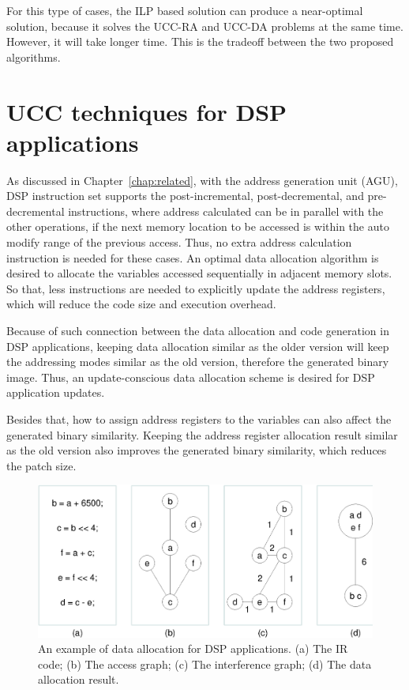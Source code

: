 For this type of cases, the ILP based solution can produce a near-optimal solution, 
because it solves the UCC-RA and UCC-DA problems at the same time. However, it will
take longer time. This is the tradeoff between the two proposed algorithms.

\section{UCC techniques for DSP applications}

As discussed in Chapter~\ref{chap:related}, with the address generation unit (AGU), DSP instruction set supports the 
post-incremental, post-decremental, and pre-decremental instructions,  where address calculated can be in parallel with 
the other operations,
if the next memory location to be accessed is within the auto modify range of the previous access.
Thus, no extra address calculation instruction is needed for these cases.
An optimal data allocation algorithm is desired to allocate the variables accessed sequentially in adjacent memory 
slots. So that, less instructions are needed to explicitly update the address registers, which will reduce the code 
size and execution overhead.

Because of such connection between the data allocation and code generation in DSP applications, keeping data allocation 
similar as the older version will keep the addressing modes similar as the old version,
therefore the generated binary image. Thus, an update-conscious data allocation scheme is desired for DSP application 
updates.

Besides that, how to assign address registers to the variables can also affect the generated binary similarity.
Keeping the address register allocation result similar as the old version also improves the generated binary 
similarity, which reduces the patch size.

\begin{figure}[ht]
\begin{center}
\includegraphics[scale=0.5]{figures/csoa.eps}
\caption[An example of data allocation for DSP applications.]{An example of data allocation for DSP applications. 
(a) The IR code; 
(b) The access graph; 
(c) The interference graph; 
(d) The data allocation result.}
\label{csoa}
\end{center}
\vspace{-10mm}
\end{figure}

